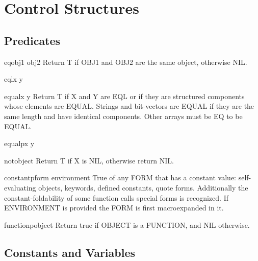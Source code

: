 \documentclass[10pt,english]{book}
\begin{document}

\chapter{Control Structures}
\label{cha:control-structures}

\section{Predicates}
\label{sec:control-predicates}

\begin{function}{eq}{obj1 obj2}
  Return T if OBJ1 and OBJ2 are the same object, otherwise NIL.
\end{function}

\begin{function}{eql}{x y}
  
\end{function}

\begin{function}{equal}{x y}
  Return T if X and Y are EQL or if they are structured components whose
elements are EQUAL. Strings and bit-vectors are EQUAL if they are the same
length and have identical components. Other arrays must be EQ to be EQUAL.
\end{function}

\begin{function}{equalp}{x y}
  
\end{function}

\begin{function}{not}{object}
  Return T if X is NIL, otherwise return NIL.
\end{function}

\begin{function}{constantp}{form \op environment}
  True of any FORM that has a constant value: self-evaluating objects,
keywords, defined constants, quote forms. Additionally the
constant-foldability of some function calls special forms is recognized. If
ENVIRONMENT is provided the FORM is first macroexpanded in it.
\end{function}

\begin{function}{functionp}{object}
  Return true if OBJECT is a FUNCTION, and NIL otherwise.
\end{function}

\section{Constants and Variables}
\label{sec:constants-variables}
\end{document}
